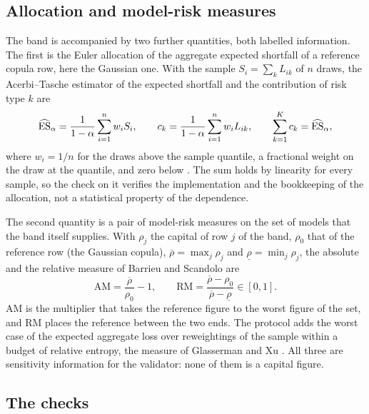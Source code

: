 \subsection{Allocation and model-risk measures}
\label{sec:method-allocation}

The band is accompanied by two further quantities, both labelled information. The first is the Euler allocation of the aggregate
expected shortfall of a reference copula row, here the Gaussian one. With the sample $S_i=\sum_k L_{ik}$ of $n$ draws, the
Acerbi--Tasche estimator of the expected shortfall and the contribution of risk type $k$ are
\begin{equation}
\widehat{\operatorname{ES}}_\alpha=\frac{1}{1-\alpha}\sum_{i=1}^n w_i S_i ,\qquad
c_k=\frac{1}{1-\alpha}\sum_{i=1}^n w_i L_{ik},\qquad \sum_{k=1}^K c_k=\widehat{\operatorname{ES}}_\alpha ,
\label{eq:euler}
\end{equation}
where $w_i=1/n$ for the draws above the sample quantile, a fractional weight on the draw at the quantile, and zero below
\citep{acerbi2002,tasche2008}. The sum holds by linearity for every sample, so the check on it verifies the implementation and the
bookkeeping of the allocation, not a statistical property of the dependence.

The second quantity is a pair of model-risk measures on the set of models that the band itself supplies. With $\rho_j$ the capital
of row $j$ of the band, $\rho_0$ that of the reference row (the Gaussian copula), $\overline\rho=\max_j\rho_j$ and
$\underline\rho=\min_j\rho_j$, the absolute and the relative measure of Barrieu and Scandolo \citep{barrieu2015} are
\begin{equation}
\mathrm{AM}=\frac{\overline\rho}{\rho_0}-1,\qquad \mathrm{RM}=\frac{\overline\rho-\rho_0}{\overline\rho-\underline\rho}\in[0,1].
\label{eq:model-risk}
\end{equation}
$\mathrm{AM}$ is the multiplier that takes the reference figure to the worst figure of the set, and $\mathrm{RM}$ places the
reference between the two ends. The protocol adds the worst case of the expected aggregate loss over reweightings of the
sample within a budget of relative entropy, the measure of Glasserman and Xu \citep{glasserman2014}. All three are sensitivity
information for the validator: none of them is a capital figure.

\subsection{The checks}
\label{sec:method-checks}

